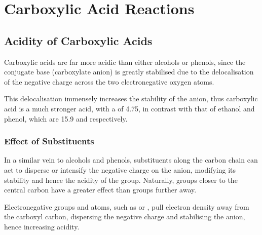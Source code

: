 

	\section{Carboxylic Acid Reactions}

		\subsection{Acidity of Carboxylic Acids}

			Carboxylic acids are far more acidic than either alcohols or phenols, since the conjugate base (carboxylate anion) is greatly
			stabilised due to the delocalisation of the negative charge across the two electronegative oxygen atoms.


			This delocalisation immensely increases the stability of the anion, thus carboxylic acid is a much stronger acid, with a \pKa of
			\num{4.75}, in contrast with that of ethanol and phenol, which are \num{15.9} and  respectively.

			\subsubsection{Effect of Substituents}

				In a similar vein to alcohols and phenols, substituents along the carbon chain can act to disperse or intensify the negative
				charge on the anion, modifying its stability and hence the acidity of the group. Naturally, groups closer to the central
				carbon have a greater effect than groups further away.

				Electronegative groups and atoms, such as \ch{\chlorine} or , pull electron density away from the carboxyl carbon,
				dispersing the negative charge and stabilising the anion, hence increasing acidity.

